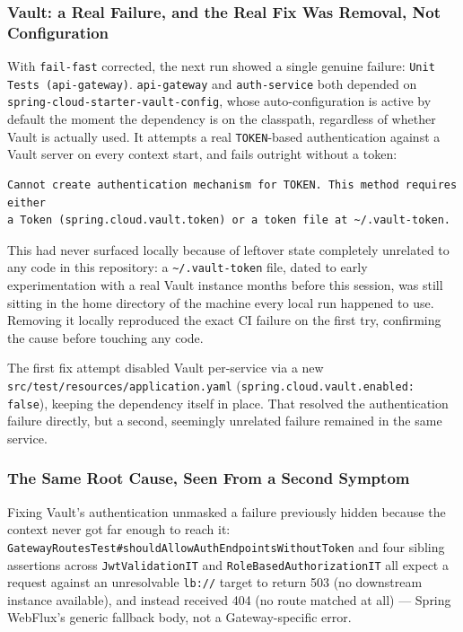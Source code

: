 \subsubsection{Vault: a Real Failure, and the Real Fix Was Removal, Not Configuration}

With \texttt{fail-fast} corrected, the next run showed a single genuine failure: \texttt{Unit Tests (api-gateway)}. \texttt{api-gateway} and \texttt{auth-service} both depended on \texttt{spring-cloud-starter-vault-config}, whose auto-configuration is active by default the moment the dependency is on the classpath, regardless of whether Vault is actually used. It attempts a real \texttt{TOKEN}-based authentication against a Vault server on every context start, and fails outright without a token:

\begin{lstlisting}[style=yamlstyle, caption={The actual failure, once the full stack trace was available}]
Cannot create authentication mechanism for TOKEN. This method requires either
a Token (spring.cloud.vault.token) or a token file at ~/.vault-token.
\end{lstlisting}

This had never surfaced locally because of leftover state completely unrelated to any code in this repository: a \texttt{\textasciitilde/.vault-token} file, dated to early experimentation with a real Vault instance months before this session, was still sitting in the home directory of the machine every local run happened to use. Removing it locally reproduced the exact CI failure on the first try, confirming the cause before touching any code.

The first fix attempt disabled Vault per-service via a new \texttt{src/test/resources/application.yaml} (\texttt{spring.cloud.vault.enabled: false}), keeping the dependency itself in place. That resolved the authentication failure directly, but a second, seemingly unrelated failure remained in the same service.

\subsubsection{The Same Root Cause, Seen From a Second Symptom}

Fixing Vault's authentication unmasked a failure previously hidden because the context never got far enough to reach it: \texttt{GatewayRoutesTest\#shouldAllowAuthEndpointsWithoutToken} and four sibling assertions across \texttt{JwtValidationIT} and \texttt{RoleBasedAuthorizationIT} all expect a request against an unresolvable \texttt{lb://} target to return 503 (no downstream instance available), and instead received 404 (no route matched at all) --- Spring WebFlux's generic fallback body, not a Gateway-specific error.

